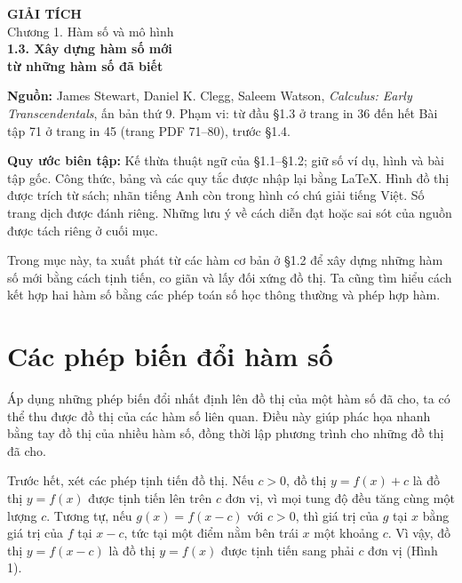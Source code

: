 \documentclass[12pt,a4paper]{article}
\begin{document}
\begin{center}
{\Large\bfseries GIẢI TÍCH}\\[5pt]
{\large Chương 1. Hàm số và mô hình}\\[9pt]
{\Large\bfseries 1.3. Xây dựng hàm số mới}\\[4pt]
{\large\bfseries từ những hàm số đã biết}
\end{center}
\noindent\textbf{Nguồn:} James Stewart, Daniel K. Clegg, Saleem Watson, \textit{Calculus: Early Transcendentals}, ấn bản thứ 9. Phạm vi: từ đầu §1.3 ở trang in 36 đến hết Bài tập 71 ở trang in 45 (trang PDF 71–80), trước §1.4.

\noindent\textbf{Quy ước biên tập:} Kế thừa thuật ngữ của §1.1–§1.2; giữ số ví dụ, hình và bài tập gốc. Công thức, bảng và các quy tắc được nhập lại bằng LaTeX. Hình đồ thị được trích từ sách; nhãn tiếng Anh còn trong hình có chú giải tiếng Việt. Số trang dịch được đánh riêng. Những lưu ý về cách diễn đạt hoặc sai sót của nguồn được tách riêng ở cuối mục.

Trong mục này, ta xuất phát từ các hàm cơ bản ở §1.2 để xây dựng những hàm số mới bằng cách tịnh tiến, co giãn và lấy đối xứng đồ thị. Ta cũng tìm hiểu cách kết hợp hai hàm số bằng các phép toán số học thông thường và phép hợp hàm.

\section*{Các phép biến đổi hàm số}
Áp dụng những phép biến đổi nhất định lên đồ thị của một hàm số đã cho, ta có thể thu được đồ thị của các hàm số liên quan. Điều này giúp phác họa nhanh bằng tay đồ thị của nhiều hàm số, đồng thời lập phương trình cho những đồ thị đã cho.

Trước hết, xét các phép tịnh tiến đồ thị. Nếu $c>0$, đồ thị $y=f(x)+c$ là đồ thị $y=f(x)$ được tịnh tiến lên trên $c$ đơn vị, vì mọi tung độ đều tăng cùng một lượng $c$. Tương tự, nếu $g(x)=f(x-c)$ với $c>0$, thì giá trị của $g$ tại $x$ bằng giá trị của $f$ tại $x-c$, tức tại một điểm nằm bên trái $x$ một khoảng $c$. Vì vậy, đồ thị $y=f(x-c)$ là đồ thị $y=f(x)$ được tịnh tiến sang phải $c$ đơn vị (Hình 1).
\end{document}
